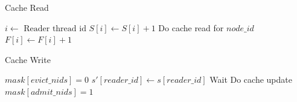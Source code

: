 \begin{minipage}{0.4\textwidth}
    \begin{algorithm}[H]
        \centering
        \caption{Cache Read} \label{Design: Alg: Cache Read}
        \footnotesize
        \begin{algorithmic}[1]
            \State $i \gets \text{ Reader thread id}$
            \State $S[i] \gets S[i] + 1$
                    \State Do cache read for $node\_id$
                \EndIf
            \EndParFor
            \State $F[i] \gets F[i] + 1$
        \EndProcedure
        
        \end{algorithmic}
    \end{algorithm}
\end{minipage}
\hfill
\begin{minipage}{0.5\textwidth}
        \begin{algorithm}[H]
            \centering
            \caption{Cache Write} \label{Design: Alg: Cache Write}
            \footnotesize
            \begin{algorithmic}[1]
                \State $mask[evict\_nids] = 0$
                    \State $s'[reader\_id] \gets s[reader\_id]$
                \EndFor
                    \State Wait
                \EndWhile
                \State Do cache update
                \State $mask[admit\_nids] = 1$
            \EndProcedure
            
            \end{algorithmic}
        \end{algorithm}
\end{minipage}


